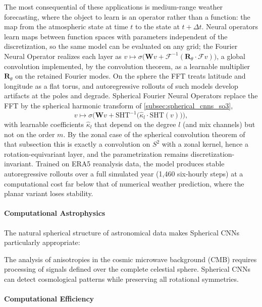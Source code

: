 The most consequential of these applications is medium-range weather forecasting, where the object to learn is an operator rather than a function: the map from the atmospheric state at time $t$ to the state at $t + \Delta t$. Neural operators \citep{kovachki2023neural} learn maps between function spaces with parameters independent of the discretization, so the same model can be evaluated on any grid; the Fourier Neural Operator realizes each layer as $v \mapsto \sigma\big(\mathbf{W} v + \mathcal{F}^{-1}(\mathbf{R}_\theta \cdot \mathcal{F} v)\big)$, a global convolution implemented, by the convolution theorem, as a learnable multiplier $\mathbf{R}_\theta$ on the retained Fourier modes. On the sphere the \gls{FFT} treats latitude and longitude as a flat torus, and autoregressive rollouts of such models develop artifacts at the poles and degrade. Spherical Fourier Neural Operators \citep{bonev2023sfno} replace the \gls{FFT} by the spherical harmonic transform of \autoref{subsec:spherical_cnns_so3},
\[v \mapsto \sigma\Big(\mathbf{W} v + \text{SHT}^{-1}\big(\hat{\kappa}_l \cdot \text{SHT}(v)\big)\Big),\]
with learnable coefficients $\hat{\kappa}_l$ that depend on the degree $l$ (and mix channels) but not on the order $m$. By the zonal case of the spherical convolution theorem of that subsection this is exactly a convolution on $S^2$ with a zonal kernel, hence a rotation-equivariant layer, and the parametrization remains discretization-invariant. Trained on ERA5 reanalysis data, the model produces stable autoregressive rollouts over a full simulated year (1{,}460 six-hourly steps) at a computational cost far below that of numerical weather prediction, where the planar variant loses stability.

\paragraph{Computational Astrophysics}

The natural spherical structure of astronomical data makes Spherical CNNs particularly appropriate:

\begin{example}
The analysis of anisotropies in the cosmic microwave background (CMB) requires processing of signals defined over the complete celestial sphere. Spherical CNNs can detect cosmological patterns while preserving all rotational symmetries.
\end{example}

\paragraph{Computational Efficiency}

